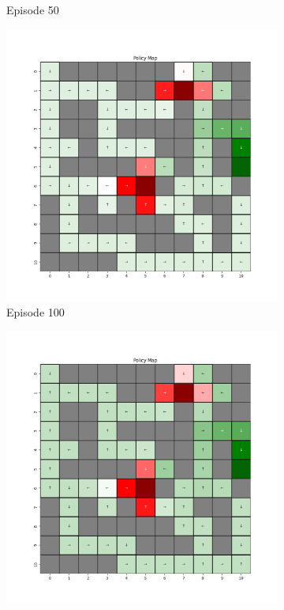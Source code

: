 \documentclass{assignment}
\begin{document}
\begin{figure}[H]
\begin{subfigure}{0.3\textwidth}
    \caption{Episode 50}
    \end{subfigure}\hfill
    \begin{subfigure}{0.3\textwidth}
        \includegraphics[width=\textwidth]{figures/policy_td/gamma_sweep/policy_alpha_0.1_gamma_0.75_epsilon_0.2_iteration_100.png}
    \caption{Episode 100}
    \end{subfigure}
    \begin{subfigure}{0.3\textwidth}
        \includegraphics[width=\textwidth]{figures/policy_td/gamma_sweep/policy_alpha_0.1_gamma_0.75_epsilon_0.2_iteration_1000.png}

\end{subfigure}
\end{figure}
\end{document}
